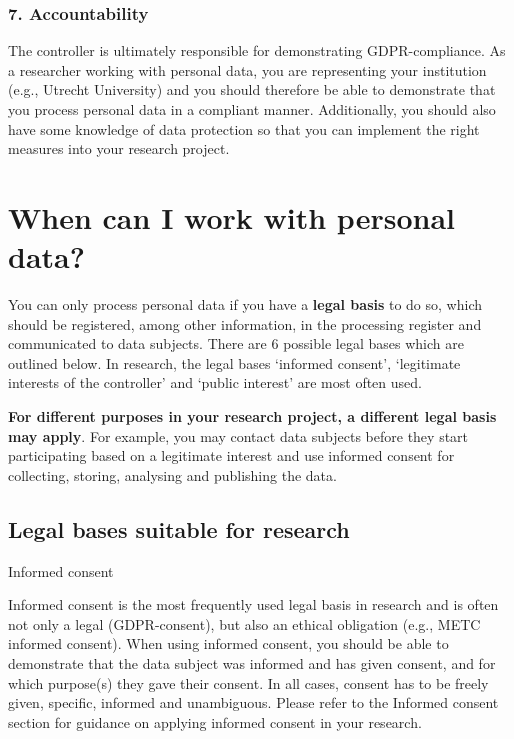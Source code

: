 \documentclass[
]{book}
\begin{document}
\hypertarget{accountability}{%
\subsubsection{7. Accountability}\label{accountability}}

The controller is ultimately responsible for demonstrating GDPR-compliance. As a
researcher working with personal data, you are representing your institution
(e.g., Utrecht University) and you should therefore be able to demonstrate that
you process personal data in a compliant manner. Additionally, you should also
have some knowledge of data protection so that you can implement the right
measures into your research project.

\hypertarget{legal-basis}{%
\section{When can I work with personal data?}\label{legal-basis}}

You can only process personal data if you have a \textbf{legal basis} to do so, which
should be registered, among other information, in the
processing register and
communicated to data subjects. There are 6 possible
legal bases which are outlined below. In research, the legal bases `informed
consent', `legitimate interests of the controller' and `public interest' are most
often used.

\textbf{For different purposes in your research project, a different
legal basis may apply}. For example, you may contact data subjects before they
start participating based on a legitimate interest and use informed consent for
collecting, storing, analysing and publishing the data.

\hypertarget{legal-bases-suitable-for-research}{%
\subsection{Legal bases suitable for research}\label{legal-bases-suitable-for-research}}

Informed consent

Informed consent is the most frequently used legal basis in research and
is often not only a legal (GDPR-consent), but also an ethical obligation
(e.g., METC informed consent). When using informed consent, you should
be able to demonstrate that the data subject was informed and has given
consent, and for which purpose(s) they gave their consent. In all cases,
consent has to be freely given, specific, informed and unambiguous. Please
refer to the Informed consent section
for guidance on applying informed consent in your research.
\end{document}
